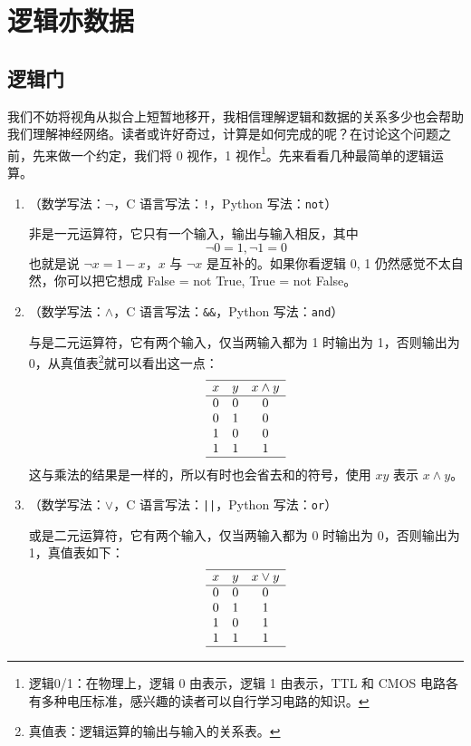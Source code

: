 \section{逻辑亦数据}
\subsection{逻辑门}

我们不妨将视角从拟合上短暂地移开，我相信理解逻辑和数据的关系多少也会帮助我们理解神经网络。读者或许好奇过，计算是如何完成的呢？在讨论这个问题之前，先来做一个约定，我们将 0 视作，1 视作\footnote{逻辑0/1：在物理上，逻辑 0 由表示，逻辑 1 由表示，TTL 和 CMOS 电路各有多种电压标准，感兴趣的读者可以自行学习电路的知识。}。先来看看几种最简单的逻辑运算。

\begin{enumerate}
    \item {}（数学写法：$\neg$，C 语言写法：\texttt{!}，Python 写法：\texttt{not}）
    
    非是一元运算符，它只有一个输入，输出与输入相反，其中
    \[
        \neg 0 = 1, \neg 1 = 0
    \]
    也就是说 $\neg x = 1 - x$，$x$ 与 $\neg x$ 是互补的。如果你看逻辑 0, 1 仍然感觉不太自然，你可以把它想成 False = not True, True = not False。

    \item {}（数学写法：$\land$，C 语言写法：\texttt{\&\&}，Python 写法：\texttt{and}）
    
    与是二元运算符，它有两个输入，仅当两输入都为 1 时输出为 1，否则输出为 0，从真值表\footnote{真值表：逻辑运算的输出与输入的关系表。}就可以看出这一点：
    \[
        \begin{array}{ccc}
            \hline
            x & y & x \land y \\
            \hline
            0 & 0 & 0 \\
            0 & 1 & 0 \\
            1 & 0 & 0 \\
            1 & 1 & 1 \\
            \hline
        \end{array}
    \]
    这与乘法的结果是一样的，所以有时也会省去和的符号，使用 $xy$ 表示 $x \land y$。
    
    \item {}（数学写法：$\lor$，C 语言写法：\texttt{||}，Python 写法：\texttt{or}）
    
    或是二元运算符，它有两个输入，仅当两输入都为 0 时输出为 0，否则输出为 1，真值表如下：
    \[
        \begin{array}{ccc}
            \hline
            x & y & x \lor y \\
            \hline
            0 & 0 & 0 \\
            0 & 1 & 1 \\
            1 & 0 & 1 \\
            1 & 1 & 1 \\
            \hline
        \end{array}
    \]
\end{enumerate}

